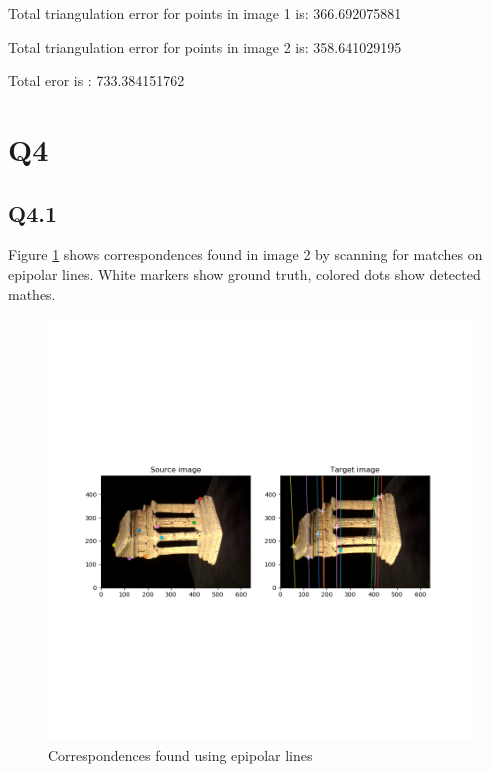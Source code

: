 \documentclass[12pt]{article}
\begin{document}
Total triangulation error for points in image 1 is: 366.692075881  
  
Total triangulation error for points in image 2 is: 358.641029195  
  
Total eror is : 733.384151762  
  

\newpage
\section{Q4}
\subsection{Q4.1}
Figure \ref{fig:corr41} shows correspondences found in image 2 by scanning for matches on epipolar lines. White markers show ground truth, colored dots show detected mathes.
\begin{figure}[H]
\centering
\includegraphics[page=1,width=1\textwidth]{q4_1}
\caption{Correspondences found using epipolar lines } 
\label{fig:corr41}
\end{figure}   

\newpage
\end{document}
